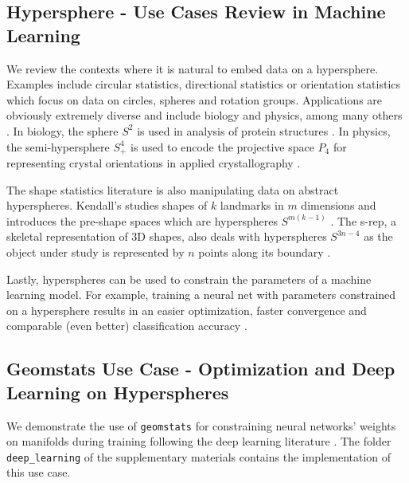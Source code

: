 \documentclass{article}
\begin{document}
\subsection{Hypersphere - Use Cases Review in Machine Learning}

We review the contexts where it is natural to embed data on a hypersphere. Examples include circular statistics, directional statistics or orientation statistics which focus on data on circles, spheres and rotation groups. Applications are obviously extremely diverse and include biology and physics, among many others \cite{Mardia2000}. In biology, the sphere $S^2$ is used in analysis of protein structures \cite{Kent2005}. In physics, the semi-hypersphere $S^4_+$ is used to encode the projective space $P_4$ for representing crystal orientations in applied crystallography \cite{Schaeben1993}. 

The shape statistics literature is also manipulating data on abstract hyperspheres. Kendall's studies shapes of $k$ landmarks in $m$ dimensions and introduces the pre-shape spaces which are hyperspheres $S^{m(k-1)}$ \cite{Kendall1989}. The s-rep, a skeletal representation of 3D shapes, also deals with hyperspheres $S^{3n-4}$ as the object under study is represented by $n$ points along its boundary \cite{Hong2016}.

Lastly, hyperspheres can be used to constrain the parameters of a machine learning model. For example, training a neural net with parameters constrained on a hypersphere results in an easier optimization, faster convergence and comparable (even better) classification accuracy \cite{Liu2017}.

\subsection{Geomstats Use Case - Optimization and Deep Learning on Hyperspheres}\label{sec:sn}

We demonstrate the use of \texttt{geomstats} for constraining neural networks' weights on manifolds during training following the deep learning literature \cite{Liu2017}. The folder \texttt{deep\_learning} of the supplementary materials contains the implementation of this use case.
\end{document}
